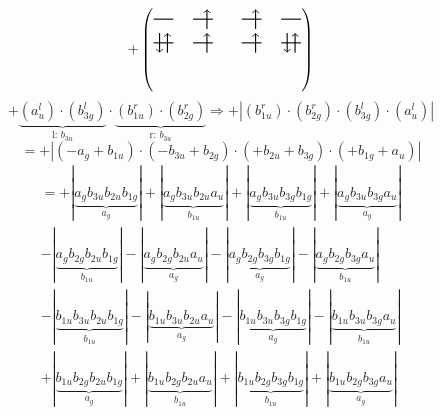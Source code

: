 \documentclass{article}
\begin{document}
\[+\left(\begin{tikzpicture}
    \draw[thick] (0,0) -- (0.5,0); %
    \draw[thick] (1,0) -- (1.5,0); %
    \draw[thick] (0,-0.6) -- (0.5,-0.6); %
    \draw[thick] (1,-0.6) -- (1.5,-0.6); %
\draw[->, thick] (1.35, -0.25) -- (1.35, 0.25); 
\draw[-> , thick] (0.35, -0.85) -- (0.35, -0.35); 
\draw[<- , thick] (0.15, -0.85) -- (0.15, -0.35); 
 \draw[-> , thick] (1.35, -0.85) -- (1.35, -0.35); 
\end{tikzpicture}\qquad \begin{tikzpicture}
    \draw[thick] (0,0) -- (0.5,0); %
    \draw[thick] (1,0) -- (1.5,0); %
    \draw[thick] (0,-0.6) -- (0.5,-0.6); %
    \draw[thick] (1,-0.6) -- (1.5,-0.6); %
\draw[->, thick] (0.35, -0.25) -- (0.35, 0.25); 
\draw[-> , thick] (0.35, -0.85) -- (0.35, -0.35); 
 \draw[-> , thick] (1.35, -0.85) -- (1.35, -0.35); 
\draw[<- , thick] (1.15, -0.85) -- (1.15, -0.35); 
\end{tikzpicture}\right)\]$$+ \underbrace{(a_{u}^{l})\cdot (b_{3g}^{l})}_{\text{l: }b_{3u}}\cdot \underbrace{(b_{1u}^{r})\cdot (b_{2g}^{r})}_{\text{r: }b_{3u}}\Rightarrow +\left|(b_{1u}^{r}) \cdot (b_{2g}^{r}) \cdot (b_{3g}^{l}) \cdot (a_{u}^{l})\right|$$$$=+\left|(-a_{g}+b_{1u}) \cdot (-b_{3u}+b_{2g}) \cdot (+b_{2u}+b_{3g}) \cdot (+b_{1g}+a_{u})\right|$$\begin{multline*}
=+\left|\underbrace{a_{g} b_{3u} b_{2u} b_{1g}}_{a_{g}}\right|+\left|\underbrace{a_{g} b_{3u} b_{2u} a_{u}}_{b_{1u}}\right|+\left|\underbrace{a_{g} b_{3u} b_{3g} b_{1g}}_{b_{1u}}\right|+\left|\underbrace{a_{g} b_{3u} b_{3g} a_{u}}_{a_{g}}\right|\\
-\left|\underbrace{a_{g} b_{2g} b_{2u} b_{1g}}_{b_{1u}}\right|-\left|\underbrace{a_{g} b_{2g} b_{2u} a_{u}}_{a_{g}}\right|-\left|\underbrace{a_{g} b_{2g} b_{3g} b_{1g}}_{a_{g}}\right|-\left|\underbrace{a_{g} b_{2g} b_{3g} a_{u}}_{b_{1u}}\right|\\
-\left|\underbrace{b_{1u} b_{3u} b_{2u} b_{1g}}_{b_{1u}}\right|-\left|\underbrace{b_{1u} b_{3u} b_{2u} a_{u}}_{a_{g}}\right|-\left|\underbrace{b_{1u} b_{3u} b_{3g} b_{1g}}_{a_{g}}\right|-\left|\underbrace{b_{1u} b_{3u} b_{3g} a_{u}}_{b_{1u}}\right|\\
+\left|\underbrace{b_{1u} b_{2g} b_{2u} b_{1g}}_{a_{g}}\right|+\left|\underbrace{b_{1u} b_{2g} b_{2u} a_{u}}_{b_{1u}}\right|+\left|\underbrace{b_{1u} b_{2g} b_{3g} b_{1g}}_{b_{1u}}\right|+\left|\underbrace{b_{1u} b_{2g} b_{3g} a_{u}}_{a_{g}}\right|

\end{multline*}
\end{document}
